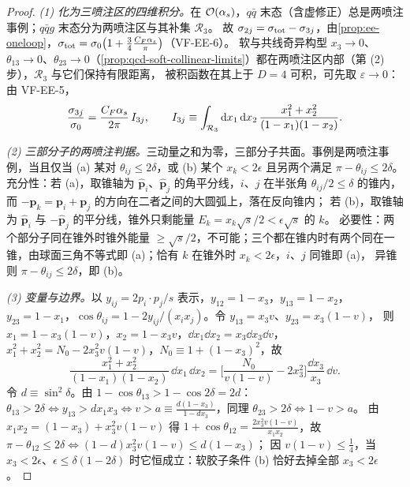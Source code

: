 \begin{proof}
\emph{(1) 化为三喷注区的四维积分。}在 $\mathcal{O}\!\left(\alpha_s\right)$，$q\bar q$ 末态（含虚修正）总是两喷注事例；$q\bar qg$ 末态分为两喷注区与其补集 $\mathcal R_3$。
故 $\sigma_{2j}=\sigma_{\rm tot}-\sigma_{3j}$，由\cref{prop:ee-oneloop}，$\sigma_{\rm tot}=\sigma_0\big(1+\frac34\frac{C_F\alpha_s}{\pi}\big)$（VF-EE-6）。%
软与共线奇异构型 $x_3\to0$、$\theta_{13}\to0$、$\theta_{23}\to0$（\cref{prop:qcd-soft-collinear-limits}）都在两喷注区内部（第 (2) 步），$\mathcal R_3$ 与它们保持有限距离，
被积函数在其上于 $D=4$ 可积，可先取 $\varepsilon\to0$：由 VF-EE-5，%
\begin{equation}\label{eq:jets-sigma3}
\frac{\sigma_{3j}}{\sigma_0}=\frac{C_F\alpha_s}{2\pi}\,I_{3j},\qquad
I_{3j}\equiv\int_{\mathcal R_3}\mathrm{d} x_1\,\mathrm{d} x_2\,\frac{x_1^2+x_2^2}{(1-x_1)(1-x_2)} .
\end{equation}

\emph{(2) 三部分子的两喷注判据。}三动量之和为零，三部分子共面。事例是两喷注事例，当且仅当
(a) 某对 $\theta_{ij}\le2\delta$，或 (b) 某个 $x_k<2\epsilon$ 且另两个满足 $\pi-\theta_{ij}\le2\delta$。
充分性：若 (a)，取锥轴为 $\hat{\bm p}_i$、$\hat{\bm p}_j$ 的角平分线，$i$、$j$ 在半张角 $\theta_{ij}/2\le\delta$ 的锥内，而 $-\bm p_k=\bm p_i+\bm p_j$ 的方向在二者之间的大圆弧上，落在反向锥内；
若 (b)，取锥轴为 $\hat{\bm p}_i$ 与 $-\hat{\bm p}_j$ 的平分线，锥外只剩能量 $E_k=x_k\sqrt s/2<\epsilon\sqrt s$ 的 $k$。
必要性：两个部分子同在锥外时锥外能量 $\ge\sqrt s/2$，不可能；三个都在锥内时有两个同在一锥，由球面三角不等式即 (a)；恰有 $k$ 在锥外时 $x_k<2\epsilon$，$i$、$j$ 同锥即 (a)，
异锥则 $\pi-\theta_{ij}\le2\delta$，即 (b)。

\emph{(3) 变量与边界。}以 $y_{ij}=2p_i\cdot p_j/s$ 表示，$y_{12}=1-x_3$，$y_{13}=1-x_2$，$y_{23}=1-x_1$，$\cos\theta_{ij}=1-2y_{ij}/(x_ix_j)$。令 $y_{13}=x_3v$、$y_{23}=x_3(1-v)$，
则 $x_1=1-x_3(1-v)$，$x_2=1-x_3v$，$\dd x_1\dd x_2=x_3\dd x_3\dd v$，$x_1^2+x_2^2=N_0-2x_3^2v(1-v)$，$N_0\equiv1+(1-x_3)^2$，故
\begin{equation}\label{eq:jets-measure}
\frac{x_1^2+x_2^2}{(1-x_1)(1-x_2)}\,\dd x_1\,\dd x_2=\Big[\frac{N_0}{v(1-v)}-2x_3^2\Big]\frac{\dd x_3}{x_3}\,\dd v .
\end{equation}
令 $d\equiv\sin^2\delta$。由 $1-\cos\theta_{13}>1-\cos2\delta=2d$：$\theta_{13}>2\delta\iff y_{13}>dx_1x_3\iff v>a\equiv\frac{d(1-x_3)}{1-dx_3}$，同理 $\theta_{23}>2\delta\iff1-v>a$。
由 $x_1x_2=(1-x_3)+x_3^2v(1-v)$ 得 $1+\cos\theta_{12}=\frac{2x_3^2v(1-v)}{x_1x_2}$，故 $\pi-\theta_{12}\le2\delta\iff(1-d)x_3^2v(1-v)\le d(1-x_3)$；
因 $v(1-v)\le\frac14$，当 $x_3<2\epsilon$、$\epsilon\le\delta(1-2\delta)$ 时它恒成立：软胶子条件 (b) 恰好去掉全部 $x_3<2\epsilon$。


\end{proof}
